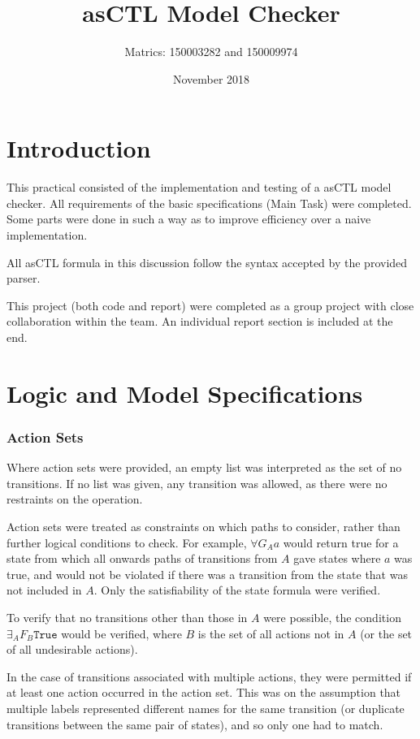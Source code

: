 \documentclass[a4paper,11pt]{article}
\title{asCTL Model Checker}
\author{Matrics: 150003282 and 150009974}
\date{November 2018}
\begin{document}
	
	\maketitle
	
	\pagebreak
	\section{Introduction}
	This practical consisted of the implementation and testing of a asCTL model checker. All requirements of the basic specifications (Main Task) were completed. Some parts were done in such a way as to improve efficiency over a naive implementation.
	
	All asCTL formula in this discussion follow the syntax accepted by the provided parser.
	
	This project (both code and report) were completed as a group project with close collaboration within the team. An individual report section is included at the end. 
	
	\section{Logic and Model Specifications}
	\subsubsection{Action Sets}
	Where action sets were provided, an empty list was interpreted as the set of no transitions. If no list was given, any transition was allowed, as there were no restraints on the operation.
	
	Action sets were treated as constraints on which paths to consider, rather than further logical conditions to check. For example, $\forall G{_Aa}$ would return true for a state from which all onwards paths of transitions from $A$ gave states where $a$ was true, and would not be violated if there was a transition from the state that was not included in $A$. Only the satisfiability of the state formula were verified.
	
	To verify that no transitions other than those in $A$ were possible, the condition $\exists _A F{_B}\texttt{True}$ would be verified, where $B$ is the set of all actions not in $A$ (or the set of all undesirable actions). 
	
	In the case of transitions associated with multiple actions, they were permitted if at least one action occurred in the action set. This was on the assumption that multiple labels represented different names for the same transition (or duplicate transitions between the same pair of states), and so only one had to match.
	
\end{document}
